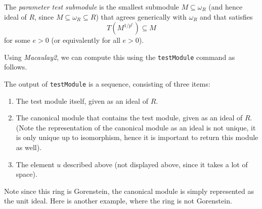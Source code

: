 \documentclass{amsart}
\begin{document}
\begin{definition}
   The \emph{parameter test submodule} is the smallest submodule $M \subseteq \omega_R$ (and hence ideal of $R$, since $M \subseteq \omega_R \subseteq R$) that agrees generically with $\omega_R$ and that satisfies
\[
T (M^{1/p^e}) \subseteq M
\]
for some $e > 0$ (or equivalently for all $e > 0$).
\end{definition}


Using \emph{Macaulay2}, we can compute this using the \texttt{testModule} command as follows.

\medskip
{\small{}
}\medskip

The output of \texttt{testModule} is a sequence, consisting of three items:
\begin{enumerate}[(1)]
\item The test module itself, given as an ideal of $R$.
\item The canonical module that contains the test module, given as an ideal of $R$.  (Note the representation of the canonical module as an ideal is not unique, it is only unique up to isomorphism, hence it is important to return this module as well).
\item The element $u$ described above (not displayed above, since it takes a lot of space).
\end{enumerate}

Note since this ring is Gorenstein, the canonical module is simply represented as the unit ideal. Here is another example, where the ring is not Gorenstein.

\medskip
{\small{}
}\medskip
\end{document}
